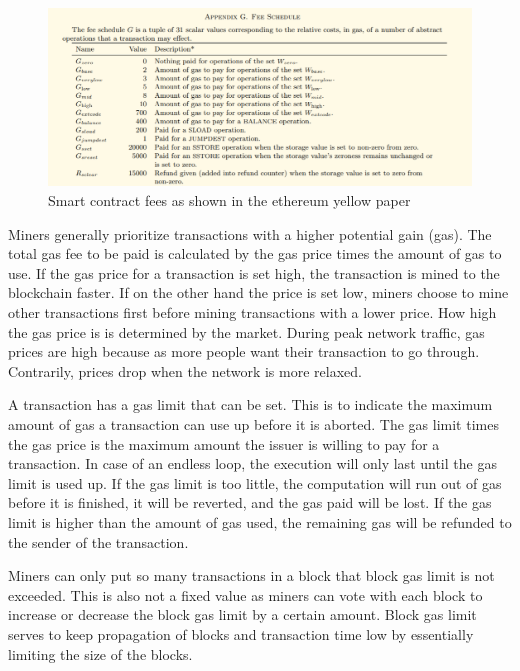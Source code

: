 \begin{figure}[ht!]
  \begin{center}
    \includegraphics[scale=0.6]{Talk7/img/smart_contracts/gas-fees}
  \end{center}
  \caption{Smart contract fees as shown in the ethereum yellow paper}
  \label{fig:smart_contract_fees}
\end{figure}

Miners generally prioritize transactions with a higher potential gain (gas). The total gas fee to be paid is calculated by the gas price times the amount of gas to use. If the gas price for a transaction is set high, the transaction is mined to the blockchain faster. If on the other hand the price is set low, miners choose to mine other transactions first before mining transactions with a lower price. How high the gas price is is determined by the market. During peak network traffic, gas prices are high because as more people want their transaction to go through. Contrarily, prices drop when the network is more relaxed.

A transaction has a gas limit that can be set. This is to indicate the maximum amount of gas a transaction can use up before it is aborted. The gas limit times the gas price is the maximum amount the issuer is willing to pay for a transaction. In case of an endless loop, the execution will only last until the gas limit is used up.
If the gas limit is too little, the computation will run out of gas before it is finished, it will be reverted, and the gas paid will be lost. If the gas limit is higher than the amount of gas used, the remaining gas will be refunded to the sender of the transaction.

Miners can only put so many transactions in a block that block gas limit is not exceeded. This is also not a fixed value as miners can vote with each block to increase or decrease the block gas limit by a certain amount. Block gas limit serves to keep propagation of blocks and transaction time low by essentially limiting the size of the blocks.

